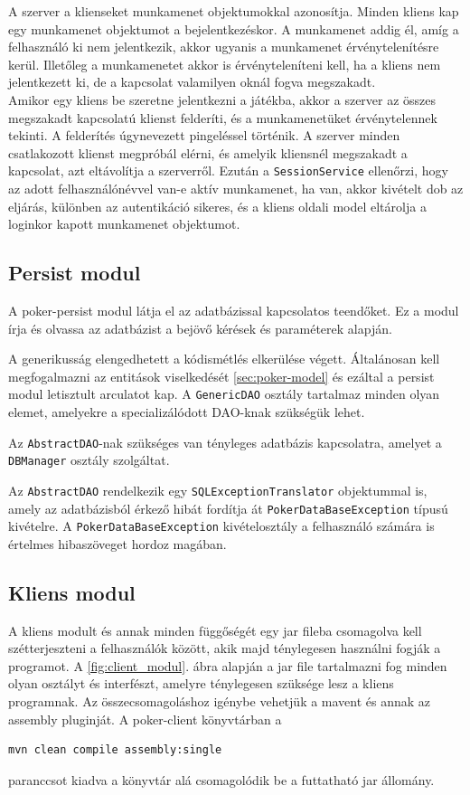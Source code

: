 A szerver a klienseket munkamenet objektumokkal azonosítja. Minden kliens kap egy munkamenet objektumot a bejelentkezéskor. A munkamenet addig él, amíg a felhasználó ki nem jelentkezik, akkor ugyanis a munkamenet érvénytelenítésre kerül. Illetőleg a munkamenetet akkor is érvényteleníteni kell, ha a kliens nem jelentkezett ki, de a kapcsolat valamilyen oknál fogva megszakadt. \\
Amikor egy kliens be szeretne jelentkezni a játékba, akkor a szerver az összes megszakadt kapcsolatú klienst felderíti, és a munkamenetüket érvénytelennek tekinti. A felderítés úgynevezett pingeléssel történik. A szerver minden csatlakozott klienst megpróbál elérni, és amelyik kliensnél megszakadt a kapcsolat, azt eltávolítja a szerverről. Ezután a \texttt{SessionService} ellenőrzi, hogy az adott felhasználónévvel van-e aktív munkamenet, ha van, akkor kivételt dob az eljárás, különben az autentikáció sikeres, és a kliens oldali model eltárolja a loginkor kapott munkamenet objektumot.

\subsection{Persist modul}
A poker-persist modul látja el az adatbázissal kapcsolatos teendőket. Ez a modul írja és olvassa az adatbázist a bejövő kérések és paraméterek alapján.

A generikusság elengedhetett a kódismétlés elkerülése végett. Általánosan kell megfogalmazni az entitások viselkedését \ref{sec:poker-model} és ezáltal a persist modul letisztult arculatot kap. A \texttt{GenericDAO} osztály tartalmaz minden olyan elemet, amelyekre a specializálódott DAO-knak szükségük lehet.

Az \texttt{AbstractDAO}-nak szükséges van tényleges adatbázis kapcsolatra, amelyet a \texttt{DBManager} osztály szolgáltat.

Az \texttt{AbstractDAO} rendelkezik egy \texttt{SQLExceptionTranslator} objektummal is, amely az adatbázisból érkező hibát fordítja át \texttt{PokerDataBaseException} típusú kivételre. A \texttt{PokerDataBaseException} kivételosztály a felhasználó számára is értelmes hibaszöveget hordoz magában.

\subsection{Kliens modul}
A kliens modult és annak minden függőségét egy jar fileba csomagolva kell szétterjeszteni a felhasználók között, akik majd ténylegesen használni fogják a programot. A \ref{fig:client_modul}. ábra alapján a jar file tartalmazni fog minden olyan osztályt és interfészt, amelyre ténylegesen szüksége lesz a kliens programnak. Az összecsomagoláshoz igénybe vehetjük a mavent és annak az assembly pluginját. A poker-client könyvtárban a
 \begin{verbatim}
mvn clean compile assembly:single
\end{verbatim}
paranccsot kiadva a  könyvtár alá csomagolódik be a futtatható jar állomány.

